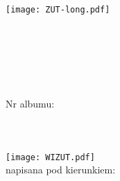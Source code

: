 \documentclass[12pt,fleqn,twoside]{book} %
\begin{document}

\begingroup
\sffamily  %
\centering %
\thispagestyle{empty} %

\texttt{[image: ZUT-long.pdf]}\\[2cm]

  \noindent {\HRule }\\[.5cm] %
  {\color{blueZUT} {\Large\ttitle }}\\[.5cm]%
  {\Large \ttitleEng }\\[.2cm]%
  {\HRule} \\[1cm] %

{\degreename}\\[2cm] 

{\color{blueZUT} {\Large\authornames}} \\
{Nr albumu:} {\albumno}\\
{\field}\\
{\speciality}\\
{\studyform}\\[1cm]

\texttt{[image: WIZUT.pdf]}\\[1cm]

{napisana pod kierunkiem:} \\
{\textbf\supname}\\


%
\end{document}
